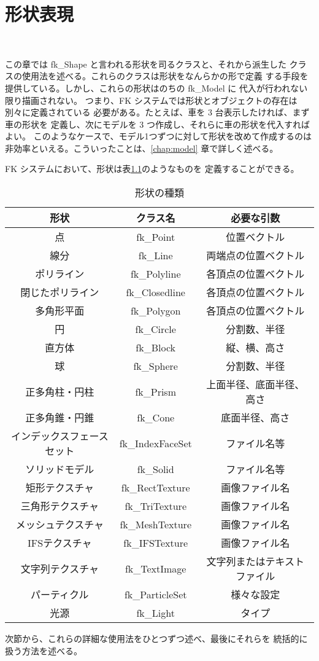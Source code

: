 \chapter{形状表現} \label{chap:shape} ~

この章では fk\_Shape と言われる形状を司るクラスと、それから派生した
クラスの使用法を述べる。これらのクラスは形状をなんらかの形で定義
する手段を提供している。しかし、これらの形状はのちの fk\_Model に
代入が行われない限り描画されない。
つまり、FK システムでは形状とオブジェクトの存在は別々に定義されている
必要がある。たとえば、車を 3 台表示したければ、まず車の形状を
定義し、次にモデルを 3 つ作成し、それらに車の形状を代入すればよい。
このようなケースで、モデル1つずつに対して形状を改めて作成するのは
非効率といえる。こういったことは、\ref{chap:model} 章で詳しく述べる。

FK システムにおいて、形状は表\ref{tbl:fkShape1}のようなものを
定義することができる。

\begin{table}[H]
\caption{形状の種類}
\label{tbl:fkShape1}
\begin{center}
\begin{tabular}{|c|c|c|}
\hline
形状 & クラス名 & 必要な引数 \\ \hline \hline
点 & fk\_Point & 位置ベクトル \\ \hline
線分 & fk\_Line & 両端点の位置ベクトル \\ \hline
ポリライン & fk\_Polyline & 各頂点の位置ベクトル \\ \hline
閉じたポリライン & fk\_Closedline & 各頂点の位置ベクトル \\ \hline
多角形平面 & fk\_Polygon & 各頂点の位置ベクトル \\ \hline
円 & fk\_Circle & 分割数、半径 \\ \hline
直方体 & fk\_Block & 縦、横、高さ \\ \hline
球 & fk\_Sphere & 分割数、半径 \\ \hline
正多角柱・円柱 & fk\_Prism & 上面半径、底面半径、高さ \\ \hline
正多角錐・円錐 & fk\_Cone & 底面半径、高さ \\ \hline
インデックスフェースセット & fk\_IndexFaceSet & ファイル名等 \\ \hline
ソリッドモデル & fk\_Solid & ファイル名等 \\ \hline
矩形テクスチャ & fk\_RectTexture & 画像ファイル名 \\ \hline
三角形テクスチャ & fk\_TriTexture & 画像ファイル名 \\ \hline
メッシュテクスチャ & fk\_MeshTexture & 画像ファイル名 \\ \hline
IFSテクスチャ & fk\_IFSTexture & 画像ファイル名 \\ \hline
文字列テクスチャ & fk\_TextImage & 文字列またはテキストファイル \\ \hline
パーティクル & fk\_ParticleSet & 様々な設定 \\ \hline
光源 & fk\_Light & タイプ \\ \hline
\end{tabular}
\end{center}
\end{table}
次節から、これらの詳細な使用法をひとつずつ述べ、最後にそれらを
統括的に扱う方法を述べる。

